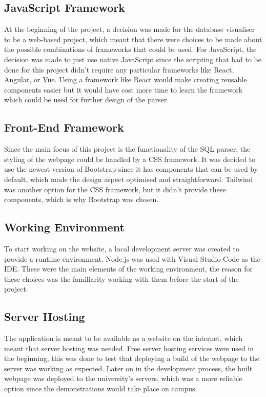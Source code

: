 \subsection{JavaScript Framework}

At the beginning of the project, a decision was made for the database visualiser to be a web-based project, which meant that there were choices to be made about the possible combinations of frameworks that could be used. For JavaScript, the decision was made to just use native JavaScript since the scripting that had to be done for this project didn't require any particular frameworks like React, Angular, or Vue. Using a framework like React would make creating reusable components easier but it would have cost more time to learn the framework which could be used for further design of the parser.

\subsection{Front-End Framework}

Since the main focus of this project is the functionality of the SQL parser, the styling of the webpage could be handled by a CSS framework. It was decided to use the newest version of Bootstrap \cite{Bootstrap} since it has components that can be used by default, which made the design aspect optimised and straightforward. Tailwind was another option for the CSS framework, but it didn't provide these components, which is why Bootstrap was chosen.

\subsection{Working Environment}

To start working on the website, a local development server was created to provide a runtime environment. Node.js was used with Visual Studio Code \cite{Code} as the IDE. These were the main elements of the working environment, the reason for these choices was the familiarity working with them before the start of the project.

\subsection{Server Hosting}

The application is meant to be available as a website on the internet, which meant that server hosting was needed. Free server hosting services\cite{Infinity} were used in the beginning, this was done to test that  deploying a build of the webpage to the server was working as expected. Later on in the development process, the built webpage was deployed to the university's servers, which was a more reliable option since the demonstrations would take place on campus.

